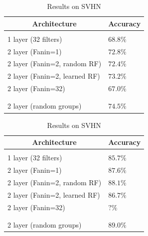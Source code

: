\documentclass{article} %
\begin{document}
\begin {table}
\parbox{.5\linewidth}{
\caption{Results on CIFAR-10}
\label{resuts-cifar10}
\begin{center}
\begin{tabular}{ll}
\multicolumn{1}{c}{\bf Architecture}  &\multicolumn{1}{c}{\bf Accuracy}
\\ \hline \\
1 layer (32 filters)                            & $68.8\%$\\
2 layer (Fanin=1)                            &$72.8\%$ \\
2 layer (Fanin=2, random RF)            &$72.4\%$ \\
2 layer (Fanin=2, learned RF)            &$73.2\%$\\
2 layer (Fanin=32)                          &$67.0\%$\\
\\ \hline \\
2 layer (random groups)                                      &$74.5\%$\\
\end{tabular}
\end{center}
}
\parbox{.5\linewidth}{
\caption{Results on SVHN}
\label{resuts-svhn}
\begin{center}
\begin{tabular}{ll}
\multicolumn{1}{c}{\bf Architecture}  &\multicolumn{1}{c}{\bf Accuracy}
\\ \hline \\
1 layer (32 filters)                          & $85.7\%$\\
2 layer (Fanin=1)                           &$87.6\%$ \\
2 layer (Fanin=2, random RF)           &$88.1\%$ \\
2 layer (Fanin=2, learned RF)           &$86.7\%$\\
2 layer (Fanin=32)                        &$?\%$\\
\\ \hline \\
2 layer (random groups)                                  &$89.0\%$\\
\end{tabular}
\end{center}
}
\end{table}
\end{document}
